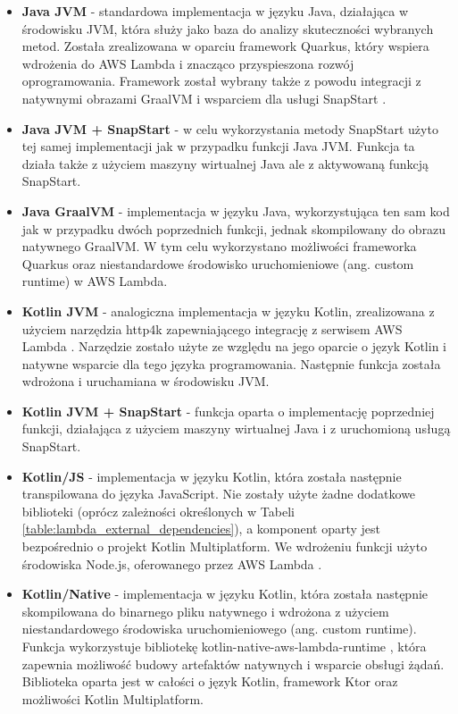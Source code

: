 \begin{itemize}
    \item \textbf{Java JVM} - standardowa implementacja w języku Java, działająca w środowisku JVM, która służy jako baza do analizy skuteczności wybranych metod.
    Została zrealizowana w oparciu framework Quarkus, który wspiera wdrożenia do AWS Lambda \cite{quarkus-docs} i znacząco przyspieszona rozwój oprogramowania.
    Framework został wybrany także z powodu integracji z natywnymi obrazami GraalVM i wsparciem dla usługi SnapStart \cite{quarkus-docs}.
    \item \textbf{Java JVM + SnapStart} - w celu wykorzystania metody SnapStart użyto tej samej implementacji jak w przypadku funkcji Java JVM.
    Funkcja ta działa także z użyciem maszyny wirtualnej Java ale z aktywowaną funkcją SnapStart.
    \item \textbf{Java GraalVM} - implementacja w języku Java, wykorzystująca ten sam kod jak w przypadku dwóch poprzednich funkcji, jednak skompilowany do obrazu natywnego GraalVM.
    W tym celu wykorzystano możliwości frameworka Quarkus oraz niestandardowe środowisko uruchomieniowe (ang. custom runtime) w AWS Lambda.
    \item \textbf{Kotlin JVM} - analogiczna implementacja w języku Kotlin, zrealizowana z użyciem narzędzia http4k zapewniającego integrację z serwisem AWS Lambda \cite{http4kCoreDocs}.
    Narzędzie zostało użyte ze względu na jego oparcie o język Kotlin i natywne wsparcie dla tego języka programowania.
    Następnie funkcja została wdrożona i uruchamiana w środowisku JVM.
    \item \textbf{Kotlin JVM + SnapStart} - funkcja oparta o implementację poprzedniej funkcji, działająca z użyciem maszyny wirtualnej Java i z uruchomioną usługą SnapStart.
    \item \textbf{Kotlin/JS} - implementacja w języku Kotlin, która została następnie transpilowana do języka JavaScript.
    Nie zostały użyte żadne dodatkowe biblioteki (oprócz zależności określonych w Tabeli \ref{table:lambda_external_dependencies}), a komponent oparty jest bezpośrednio o projekt Kotlin Multiplatform.
    We wdrożeniu funkcji użyto środowiska Node.js, oferowanego przez AWS Lambda \cite{awsLambdaDocs}.
    \item \textbf{Kotlin/Native} - implementacja w języku Kotlin, która została następnie skompilowana do binarnego pliku natywnego i wdrożona z użyciem niestandardowego środowiska uruchomieniowego (ang. custom runtime).
    Funkcja wykorzystuje bibliotekę kotlin-native-aws-lambda-runtime \cite{kotlinNativeLambdaRuntime}, która zapewnia możliwość budowy artefaktów natywnych i wsparcie obsługi żądań.
    Biblioteka oparta jest w całości o język Kotlin, framework Ktor oraz możliwości Kotlin Multiplatform. 
\end{itemize}

